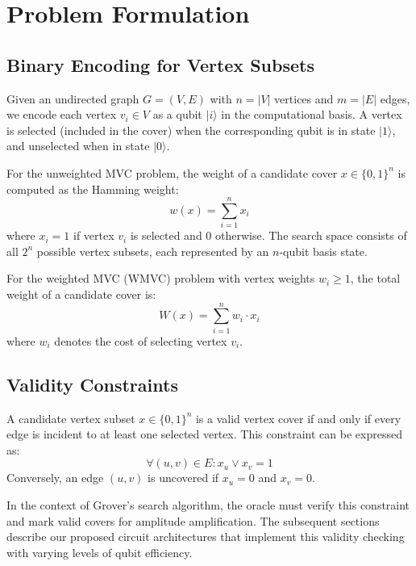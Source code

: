 \documentclass{ieeeaccess}
\begin{document}
\section{Problem Formulation}
\label{sec:problem}

\subsection{Binary Encoding for Vertex Subsets}
Given an undirected graph $G = (V, E)$ with $n = |V|$ vertices and $m = |E|$ edges, we encode each vertex $v_i \in V$ as a qubit $|i\rangle$ in the computational basis. A vertex is selected (included in the cover) when the corresponding qubit is in state $|1\rangle$, and unselected when in state $|0\rangle$. 

For the unweighted MVC problem, the weight of a candidate cover $x \in \{0,1\}^n$ is computed as the Hamming weight:
\begin{equation}
    w(x) = \sum_{i=1}^{n} x_i
\end{equation}
where $x_i = 1$ if vertex $v_i$ is selected and $0$ otherwise. The search space consists of all $2^n$ possible vertex subsets, each represented by an $n$-qubit basis state.

For the weighted MVC (WMVC) problem with vertex weights $w_i \geq 1$, the total weight of a candidate cover is:
\begin{equation}
    W(x) = \sum_{i=1}^{n} w_i \cdot x_i
\end{equation}
where $w_i$ denotes the cost of selecting vertex $v_i$.

\subsection{Validity Constraints}
A candidate vertex subset $x \in \{0,1\}^n$ is a valid vertex cover if and only if every edge is incident to at least one selected vertex. This constraint can be expressed as:
\begin{equation}
    \forall (u, v) \in E: x_u \lor x_v = 1
\end{equation}
Conversely, an edge $(u, v)$ is uncovered if $x_u = 0$ and $x_v = 0$.

In the context of Grover's search algorithm, the oracle must verify this constraint and mark valid covers for amplitude amplification. The subsequent sections describe our proposed circuit architectures that implement this validity checking with varying levels of qubit efficiency.
\end{document}
